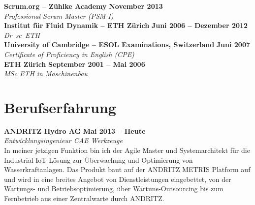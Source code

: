 \documentclass[line,11pt,a4paper]{../resume}
\begin{document}
\begin{resume}
\textbf{Scrum.org -- Zühlke Academy} \hfill \textbf{November 2013}%
\vspace{2mm}\\\vspace{1mm}%
\textsl{Professional Scrum Master (PSM I)}%
\vspace{2mm}\\\vspace{-1mm}%
%
\textbf{Institut für Fluid Dynamik -- ETH Zürich} \hfill \textbf{Juni 2006 -- Dezember 2012}%
\vspace{2mm}\\\vspace{1mm}%
\textsl{Dr\ sc\ ETH}%
\vspace{2mm}\\\vspace{-1mm}%
%
\textbf{University of Cambridge -- ESOL Examinations, Switzerland} \hfill \textbf{Juni 2007}%
\vspace{2mm}\\\vspace{1mm}%
\textsl{Certificate of Proficiency in English (CPE)}%
\vspace{2mm}\\\vspace{-1mm}%
%
\textbf{ETH Zürich} \hfill \textbf{September 2001 -- Mai 2006}%
\vspace{2mm}\\\vspace{1mm}%
\textsl{MSc ETH in Maschinenbau}%
\vspace{-3mm}\\\vspace{-1mm}%

\section{\mysidestyle Berufserfahrung}\vspace{2mm}

\textbf{ANDRITZ Hydro AG} \hfill \textbf{Mai 2013 -- Heute}
\vspace{2mm}\\\vspace{1mm}%
\textsl{Entwicklungsingenieur CAE Werkzeuge}\\
In meiner jetzigen Funktion bin ich der Agile Master und Systemarchitekt für
die Industrial IoT Lösung zur Überwachung und Optimierung von
Wasserkraftanlagen. Das Produkt baut auf der ANDRITZ METRIS Platform auf und
wird in eine breites Angebot von Dienstleistungen eingebettet, von der
Wartungs- und Betriebsoptimierung, über Wartuns-Outsourcing bis zum
Fernbetrieb aus einer Zentralwarte durch ANDRITZ.


\end{resume}
\end{document}
